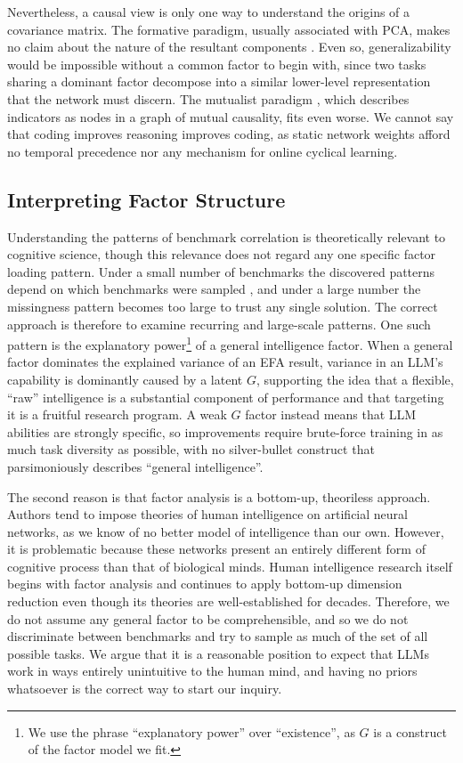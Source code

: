 \documentclass{article} %
\begin{document}
Nevertheless, a causal view is only one way to understand the origins of a covariance matrix. The formative paradigm, usually associated with PCA, makes no claim about the nature of the resultant
components \citep{vandermaas2014}. Even so, generalizability would be impossible without a common factor to begin with, since two tasks sharing a dominant factor decompose into a similar lower-level
representation \citep{caruana1997,menghi2025} that the network must discern. The mutualist paradigm \citep{borsboom2013}, which describes indicators as nodes in a graph of mutual causality, fits even
worse. We cannot say that coding improves reasoning improves coding, as static network weights afford no temporal precedence nor any mechanism for online cyclical learning.

\hypertarget{interpreting-factor-structure}{%
\subsection{Interpreting Factor Structure}\label{interpreting-factor-structure}}

Understanding the patterns of benchmark correlation is theoretically relevant to cognitive science, though this relevance does not regard any one specific factor loading pattern. Under a small number
of benchmarks the discovered patterns depend on which benchmarks were sampled \citep{major2011}, and under a large number the missingness pattern becomes too large to trust any single solution. The
correct approach is therefore to examine recurring and large-scale patterns. One such pattern is the explanatory power\footnote{We use the phrase ``explanatory power'' over ``existence'', as \(G\) is
  a construct of the factor model we fit.} of a general intelligence factor. When a general factor dominates the explained variance of an EFA result, variance in an LLM's capability is dominantly
caused by a latent \(G\), supporting the idea that a flexible, ``raw'' intelligence is a substantial component of performance and that targeting it is a fruitful research program. A weak \(G\) factor
instead means that LLM abilities are strongly specific, so improvements require brute-force training in as much task diversity as possible, with no silver-bullet construct that parsimoniously
describes ``general intelligence''.

The second reason is that factor analysis is a bottom-up, theoriless approach. Authors tend to impose theories of human intelligence on artificial neural networks, as we know of no better model of
intelligence than our own. However, it is problematic because these networks present an entirely different form of cognitive process than that of biological minds. Human intelligence research itself
begins with factor analysis \citep{spearman1904} and continues to apply bottom-up dimension reduction even though its theories are well-established for decades. Therefore, we do not assume any general
factor to be comprehensible, and so we do not discriminate between benchmarks and try to sample as much of the set of all possible tasks. We argue that it is a reasonable position to expect that LLMs
work in ways entirely unintuitive to the human mind, and having no priors whatsoever is the correct way to start our inquiry.
\end{document}
